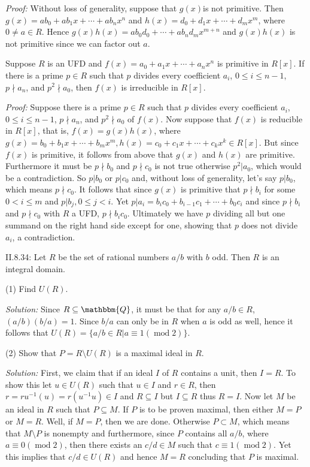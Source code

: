\documentclass{letter}
\newcommand{\tmem}[1]{{\em #1\/}}
\newcommand{\tmop}[1]{\ensuremath{\operatorname{#1}}}
\begin{document}
{\tmem{Proof:}} Without loss of generality, suppose that $g (x)$is not
primitive. Then $g (x) = a b_0 + a b_1 x + \cdots + a b_n x^n$ and $h (x) =
d_0 + d_1 x + \cdots + d_m x^m$, where $0 \neq a \in R$. Hence $g (x) h (x) =
a b_0 d_0 + \cdots + a b_n d_m x^{m + n}$ and $g (x) h (x)$ is not primitive
since we can factor out $a$.

Suppose $R$ is an UFD and $f (x) = a_0 + a_1 x + \cdots + a_n x^n$ is
primitive in $R [x]$. If there is a prime $p \in R$ such that $p$ divides
every coefficient $a_i$, $0 \leq i \leq n - 1$, $p \nmid a_n$, and $p^2 \nmid
a_0$, then $f (x)$ is irreducible in $R [x]$.

{\tmem{Proof:}} Suppose there is a prime $p \in R$ such that $p$ divides
every coefficient $a_i$, $0 \leq i \leq n - 1$, $p \nmid a_n$, and $p^2 \nmid
a_0$ of $f (x)$. Now suppose that $f (x)$ is reducible in $R [x]$, that is, $f
(x) = g (x) h (x)$, where $g (x) = b_0 + b_1 x + \cdots + b_m x^m, h (x) = c_0
+ c_1 x + \cdots + c_k x^k \in R [x]$. But since $f (x)$ is primitive, it
follows from above that $g (x)$ and $h (x)$ are primitive. Furthermore it must
be $p \nmid b_0$ and $p \nmid c_0$ is not true otherwise $p^2 | a_0$, which
would be a contradiction. So $p|b_0$ or $p|c_0$ and, without loss of
generality, let's say $p | b_0$, which means $p \nmid c_0$. It follows that
since $g (x)$ is primitive that $p \nmid b_i$ for some $0 < i \leq m$ and
$p|b_j, 0 \leq j < i$. Yet $p | a_i = b_i c_0 + b_{i - 1} c_1 + \cdots + b_0
c_i$ and since $p \nmid b_i$ and $p \nmid c_0$ with $R$ a UFD, $p \nmid b_i
c_0$. Ultimately we have $p$ dividing all but one summand on the right hand
side except for one, showing that $p$ does not divide $a_i$, a contradiction.

II.8.34: Let $R$ be the set of rational numbers $a / b$ with $b$ odd. Then $R$
is an integral domain.

(1) Find $U (R)$.

{\tmem{Solution:}} Since $R \subseteq \mathbbm{Q}$, it must be that for any $a
/ b \in R$, $(a / b) (b / a) = 1$. Since $b / a$ can only be in $R$ when $a$
is odd as well, hence it follows that $U (R) =\{a / b \in R | a \equiv 1
(\tmop{mod} 2)\}$.

(2) Show that $P = R \setminus U (R)$ is a maximal ideal in $R$.

{\tmem{Solution:}} First, we claim that if an ideal $I$ of $R$ contains a
unit, then $I = R$. To show this let $u \in U (R)$ such that $u \in I$ and $r
\in R$, then $r = r u^{- 1} (u) = r (u^{- 1} u) \in I$ and $R \subseteq I$ but
$I \subseteq R$ thus $R = I$. Now let $M$ be an ideal in $R$ such that $P
\subseteq M$. If $P$ is to be proven maximal, then either $M = P$ or $M = R$.
Well, if $M = P$, then we are done. Otherwise $P \subset M$, which means that
$M \setminus P$ is nonempty and furthermore, since $P$ contains all $a / b$,
where $a \equiv 0 (\tmop{mod} 2)$, then there exists an $c / d \in M$ such
that $c \equiv 1 (\tmop{mod} 2)$. Yet this implies that $c / d \in U (R)$ and
hence $M = R$ concluding that $P$ is maximal.
\end{document}
